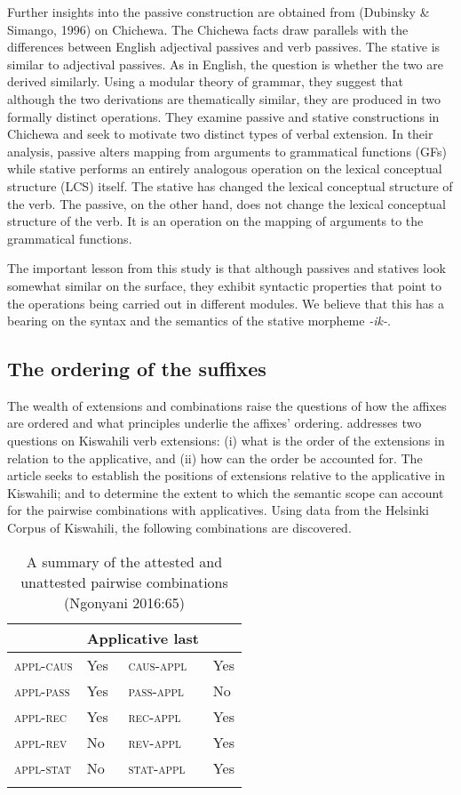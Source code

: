 \documentclass[output=paper]{langscibook}
\begin{document}
Further insights into the passive construction are obtained from (Dubinsky \& Simango, 1996) on Chichewa. The Chichewa facts draw parallels with the differences between English adjectival passives and verb passives. The stative is similar to adjectival passives. As in English, the question is whether the two are derived similarly. Using a modular theory of grammar, they suggest that although the two derivations are thematically similar, they are produced in two formally distinct operations. They examine passive and stative constructions in Chichewa and seek to motivate two distinct types of verbal extension. In their analysis, passive alters mapping from arguments to grammatical functions (GFs) while stative performs an entirely analogous operation on the lexical conceptual structure (LCS) itself. The stative has changed the lexical conceptual structure of the verb. The passive, on the other hand, does not change the lexical conceptual structure of the verb. It is an operation on the mapping of arguments to the grammatical functions. 

The important lesson from this study is that although passives and statives look somewhat similar on the surface, they exhibit syntactic properties that point to the operations being carried out in different modules. We believe that this has a bearing on the syntax and the semantics of the stative morpheme \textit{-ik-}. 

\subsection {The ordering of the suffixes}
The wealth of extensions and combinations raise the questions of how the affixes are ordered and what principles underlie the affixes' ordering. \citet{Ngonyani:2016aa} addresses two questions on Kiswahili verb extensions: (i) what is the order of the extensions in relation to the applicative, and (ii) how can the order be accounted for. The article seeks to establish the positions of extensions relative to the applicative in Kiswahili;  and to determine the extent to which the semantic scope can account for the pairwise combinations with applicatives. Using data from the Helsinki Corpus of Kiswahili, the following combinations are discovered.  

\begin{table}
    \centering
\begin{tabular}{ llll }
 \lsptoprule
  \multicolumn{2}{c}{Applicative first} & \multicolumn{2}{c}{Applicative last}   \\
 \midrule
 \textsc{appl-caus} & Yes & \textsc{caus-appl} & Yes \\
 \textsc{appl-pass} & Yes & \textsc{pass-appl} & No\\
 \textsc{appl-rec} & Yes & \textsc{rec-appl} & Yes\\
 \textsc{appl-rev} & No & \textsc{rev-appl} & Yes\\
 \textsc{appl-stat} & No & \textsc{stat-appl} & Yes\\
 \lspbottomrule
\end{tabular}
    \caption{A summary of the attested and unattested pairwise combinations (Ngonyani 2016:65)\label{table3}}
\end{table}
\end{document}

